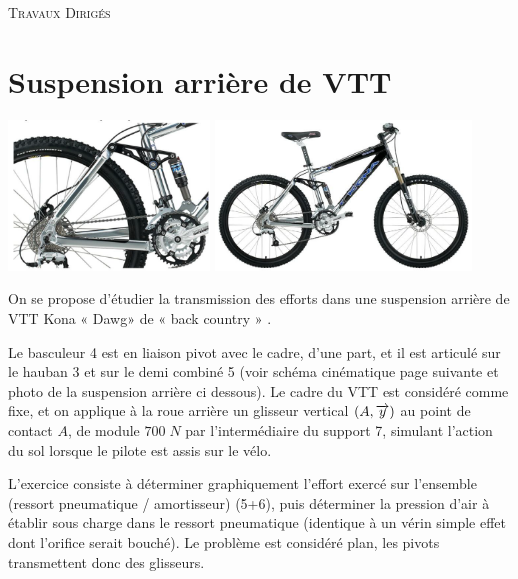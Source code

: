\documentclass[10pt]{article}
\begin{document}

\begin{center}
\Large{\textsc{Travaux Dirigés}}
\end{center}



\section*{Suspension arrière de VTT}

\begin{center}
\includegraphics[height=4cm]{images/vtt1}
\hspace{1.5cm}
\includegraphics[height=4cm]{images/vtt2}
\end{center}

On se propose d’étudier la transmission des efforts dans une suspension arrière de VTT Kona
« Dawg» de « back country » .

Le basculeur 4 est en liaison pivot avec le cadre, d'une part, et il est articulé sur le hauban 3 et sur le
demi combiné 5 (voir schéma cinématique page suivante et photo de la suspension arrière ci
dessous).
Le cadre du VTT est considéré comme fixe, et on applique à la roue arrière un glisseur vertical $(A,\overrightarrow{y})$
au point de contact $A$, de module $700\;N$ par l'intermédiaire du support 7, simulant l’action du sol
lorsque le pilote est assis sur le vélo.

L'exercice consiste à déterminer graphiquement l’effort exercé sur l’ensemble (ressort pneumatique
/ amortisseur) (5+6), puis déterminer la pression d’air à établir sous charge dans le ressort
pneumatique (identique à un vérin simple effet dont l’orifice serait bouché).
Le problème est considéré plan, les pivots transmettent donc des glisseurs.
\end{document}
